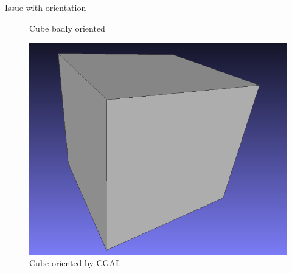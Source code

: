 \documentclass[10pt]{beamer}
\begin{document}
\begin{frame}{Issue with orientation}
\begin{figure}
\begin{minipage}[b]{0.3\textwidth}
          \caption{Cube badly oriented}
        \end{minipage}%
        \begin{minipage}[b]{0.3\textwidth}
          \centering
          \includegraphics[width=\textwidth]{../image/bon_cube.png}
          \caption{Cube oriented by CGAL}
        \end{minipage}
      \end{figure}
\end{frame}
\end{document}
